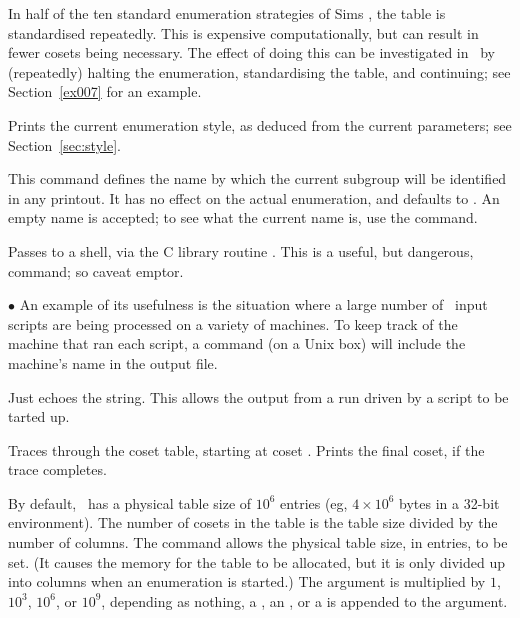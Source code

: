 In half of the ten standard enumeration strategies of Sims \cite{Sim}, the
  table is standardised repeatedly.
This is expensive computationally, but can result in fewer cosets being
  necessary.
The effect of doing this can be investigated in \ace\ by (repeatedly)
  halting the enumeration, standardising the table, and continuing; see 
  Section~\ref{ex007} for an example.

\quad{}

Prints the current enumeration style, as deduced from the current 
  \amp {} parameters; see Section~\ref{sec:style}.

\quad{}

This command defines the name by which the current subgroup will be
  identified in any printout.
It has no effect on the actual enumeration, and defaults to .
An empty name is accepted; to see what the current name is, use the
   command.

\quad{}

Passes  to a shell, via the C library routine .
This is a useful, but dangerous, command; so caveat emptor.

$\bullet$
An example of its usefulness is the situation where a large number of 
  \ace\ input scripts are being processed on a variety of machines.
To keep track of the machine that ran each script, a  
    command (on a Unix box) will include the machine's
  name in the output file.

\quad{}

Just echoes the string.
This allows the output from a run driven by a script to be tarted up.

\quad{}

Traces  through the coset table, starting at coset .
Prints the final coset, if the trace completes.

\quad{}

By default, \ace\ has a physical table size of $10^6$ entries (eg, 
  $4 \times 10^6$ bytes in a 32-bit environment).
The number of cosets in the table is the table size divided by the number
  of columns.
The  command allows the physical table size, in entries, to be
  set.
(It causes the memory for the table to be allocated, but it is only divided
  up into columns when an enumeration is started.)
The argument is multiplied by $1$, $10^3$\kern-2pt, $10^6$\kern-2pt, or 
  $10^9$\kern-2pt, depending as nothing, a , an , or a 
   is appended to the argument.

